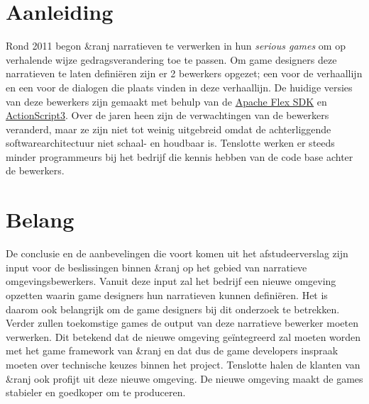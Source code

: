 \documentclass{report}
\newcommand{\organisation}{\&ranj }
\begin{document}
\section{Aanleiding}

Rond 2011 begon \organisation narratieven te verwerken in hun \emph{serious games} om op verhalende wijze gedragsverandering toe te passen. Om game designers deze narratieven te laten defini{\"e}ren zijn er 2 bewerkers opgezet; een voor de verhaallijn en een voor de dialogen die plaats vinden in deze verhaallijn. De huidige versies van deze bewerkers zijn gemaakt met behulp van de \href{https://en.wikipedia.org/wiki/Apache_Flex}{Apache Flex SDK} en \href{http://www.adobe.com/devnet/actionscript/articles/actionscript3_overview.html}{ActionScript3}.
Over de jaren heen zijn de verwachtingen van de bewerkers veranderd, maar ze zijn niet tot weinig uitgebreid omdat de achterliggende softwarearchitectuur niet schaal- en houdbaar is. Tenslotte werken er steeds minder programmeurs bij het bedrijf die kennis hebben van de code base achter de bewerkers.

\section{Belang}
De conclusie en de aanbevelingen die voort komen uit het afstudeerverslag zijn input voor de beslissingen binnen \organisation op het gebied van narratieve omgevingsbewerkers. Vanuit deze input zal het bedrijf een nieuwe omgeving opzetten waarin game designers hun narratieven kunnen defini{\"e}ren. Het is daarom ook belangrijk om de game designers bij dit onderzoek te betrekken. Verder zullen toekomstige games de output van deze narratieve bewerker moeten verwerken. Dit betekend dat de nieuwe omgeving ge{\"i}ntegreerd zal moeten worden met het game framework van \organisation en dat dus de game developers inspraak moeten over technische keuzes binnen het project. Tenslotte halen de klanten van \organisation ook profijt uit deze nieuwe omgeving. De nieuwe omgeving maakt de games stabieler en goedkoper om te produceren.
\end{document}
